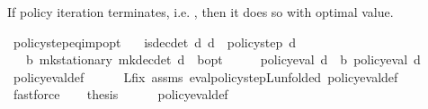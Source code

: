 \begin{isabellebody}
\isamarkupfalse%
%
\endisatagproof
{\isafoldproof}%
%
\isadelimproof
%
\endisadelimproof
%
\begin{isamarkuptext}%
If policy iteration terminates, i.e. , then it does so with optimal value.%
\end{isamarkuptext}\isamarkuptrue%
\isamarkupfalse%
\ policy{\isacharunderscore}{\kern0pt}step{\isacharunderscore}{\kern0pt}eq{\isacharunderscore}{\kern0pt}imp{\isacharunderscore}{\kern0pt}opt{\isacharcolon}{\kern0pt}\isanewline
\ \ \ {\isachardoublequoteopen}is{\isacharunderscore}{\kern0pt}dec{\isacharunderscore}{\kern0pt}det\ d{\isachardoublequoteclose}\ {\isachardoublequoteopen}d\ {\isacharequal}{\kern0pt}\ policy{\isacharunderscore}{\kern0pt}step\ d{\isachardoublequoteclose}\ \isanewline
\ \ \ {\isachardoublequoteopen}{\isasymnu}\isactrlsub b\ {\isacharparenleft}{\kern0pt}mk{\isacharunderscore}{\kern0pt}stationary\ {\isacharparenleft}{\kern0pt}mk{\isacharunderscore}{\kern0pt}dec{\isacharunderscore}{\kern0pt}det\ d{\isacharparenright}{\kern0pt}{\isacharparenright}{\kern0pt}\ {\isacharequal}{\kern0pt}\ {\isasymnu}\isactrlsub b{\isacharunderscore}{\kern0pt}opt{\isachardoublequoteclose}\isanewline
%
\isadelimproof
%
\endisadelimproof
%
\isatagproof
{}\isamarkupfalse%
\ {\isacharminus}{\kern0pt}\isanewline
\ \ \isamarkupfalse%
\ {\isachardoublequoteopen}policy{\isacharunderscore}{\kern0pt}eval\ d\ {\isacharequal}{\kern0pt}\ {\isasymL}\isactrlsub b\ {\isacharparenleft}{\kern0pt}policy{\isacharunderscore}{\kern0pt}eval\ d{\isacharparenright}{\kern0pt}{\isachardoublequoteclose}\isanewline
\ \ \ \ \isamarkupfalse%
\ policy{\isacharunderscore}{\kern0pt}eval{\isacharunderscore}{\kern0pt}def\isanewline
\ \ \ \ \isamarkupfalse%
\ L{\isacharunderscore}{\kern0pt}{\isasymnu}{\isacharunderscore}{\kern0pt}fix\ assms\ eval{\isacharunderscore}{\kern0pt}policy{\isacharunderscore}{\kern0pt}step{\isacharunderscore}{\kern0pt}L{\isacharbrackleft}{\kern0pt}unfolded\ policy{\isacharunderscore}{\kern0pt}eval{\isacharunderscore}{\kern0pt}def{\isacharbrackright}{\kern0pt}\isanewline
\ \ \ \ \isamarkupfalse%
\ fastforce\isanewline
\ \ \isamarkupfalse%
\ {\isacharquery}{\kern0pt}thesis\isanewline
\ \ \ \ \isamarkupfalse%
\ policy{\isacharunderscore}{\kern0pt}eval{\isacharunderscore}{\kern0pt}def\isanewline
\ \ \ \ \isamarkupfalse%

\end{isabellebody}
